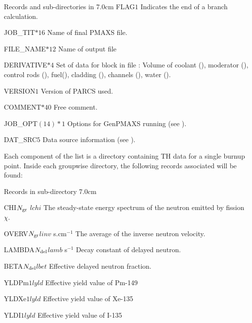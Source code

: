  \begin{DescriptionEnregistrement}{Records and sub-directories
 in  }{7.0cm} \label{tabl:tabgen}
\IntEnr
 {FLAG}{$1$}
 {Indicates the end of a branch calculation.} 
 
\CharEnr
 {JOB\_TIT}{$*16$}
 {Name of final PMAXS file. } 
  
\CharEnr
 {FILE\_NAME}{$*12$}
 {Name of output  file } 
  
\CharEnr
 {DERIVATIVE}{$*4$}
 {Set of data for  block in  file : Volume of coolant (), moderator (), control rods (), fuel(), cladding (), channels (), water (). }
 
 \RealEnr
 {VERSION}{$1$}{ }
 {Version of PARCS used. }
 
  \CharEnr
 {COMMENT}{$*40$}
 {Free comment. }
    
\CharEnr
 {JOB\_OPT}{$(14)*1$}
 {Options for GenPMAXS running (see \cite{GENPMAXS}). }
 
 \RealEnr
 {DAT\_SRC}{$5$}{ }
 {Data source information (see \cite{GENPMAXS}). }
  
 \end{DescriptionEnregistrement}
 
Each component of the list  is a directory containing TH data for a single burnup point. Inside each groupwise directory, the following records associated will be found:
 
 \begin{DescriptionEnregistrement}{Records 
 in sub-directory  }{7.0cm} \label{tabl:tabTH}
 
 \OptRealEnr
 {CHI}{$N_{\rm gr}$} {$lchi$} { }
 {The steady-state energy spectrum of the neutron emitted by fission $\chi$. }
 
  \OptRealEnr
 {OVERV}{$N_{\rm gr}$}{$linv$} {s.cm$^{-1}$}
 {The average of the inverse neutron velocity. }
 
   \OptRealEnr
 {LAMBDA}{$N_{\rm del}$}{$lamb$} {s$^{-1}$}
 {Decay constant of delayed neutron. }
 
   \OptRealEnr
 {BETA}{$N_{\rm del}$}{$lbet$} {}
 {Effective delayed neutron fraction. }
  
   \OptRealEnr
 {YLDPm}{$1$}{$lyld$} { }
 { Effective yield value of Pm-149 }
 
    \OptRealEnr
 {YLDXe}{$1$}{$lyld$} { }
 { Effective yield value of Xe-135 }
 
     \OptRealEnr
 {YLDI}{$1$}{$lyld$} { }
 { Effective yield value of I-135 }

  
 \end{DescriptionEnregistrement} 
 
